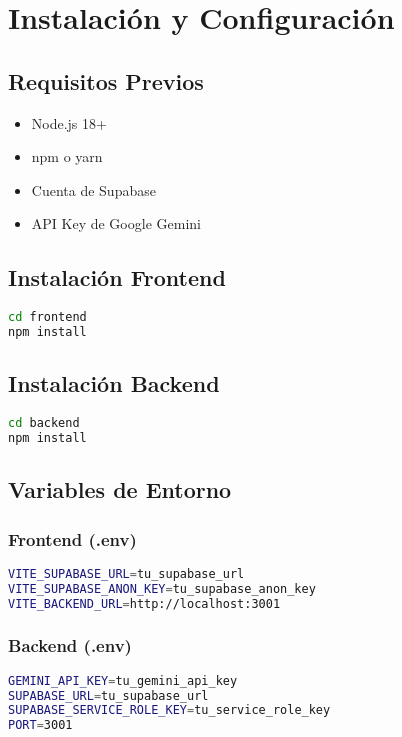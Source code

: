 \documentclass[12pt,a4paper]{report}
\begin{document}
\chapter{Instalación y Configuración}

\section{Requisitos Previos}
\begin{itemize}
    \item Node.js 18+
    \item npm o yarn
    \item Cuenta de Supabase
    \item API Key de Google Gemini
\end{itemize}

\section{Instalación Frontend}
\begin{lstlisting}[language=bash]
cd frontend
npm install
\end{lstlisting}

\section{Instalación Backend}
\begin{lstlisting}[language=bash]
cd backend
npm install
\end{lstlisting}

\section{Variables de Entorno}

\subsection{Frontend (.env)}
\begin{lstlisting}[language=bash]
VITE_SUPABASE_URL=tu_supabase_url
VITE_SUPABASE_ANON_KEY=tu_supabase_anon_key
VITE_BACKEND_URL=http://localhost:3001
\end{lstlisting}

\subsection{Backend (.env)}
\begin{lstlisting}[language=bash]
GEMINI_API_KEY=tu_gemini_api_key
SUPABASE_URL=tu_supabase_url
SUPABASE_SERVICE_ROLE_KEY=tu_service_role_key
PORT=3001
\end{lstlisting}
\end{document}

